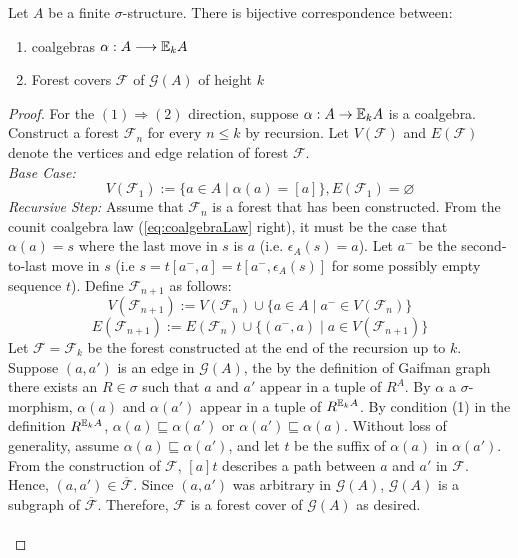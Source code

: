 \begin{prop}
Let $A$ be a finite $\sigma$-structure. There is bijective correspondence between:
\begin{enumerate}[label=(\arabic*)]
\item coalgebras $\alpha:A \longrightarrow {\mathbb{E}_{k}A}$
\item Forest covers $\mathcal{F}$ of $\mathcal{G}(A)$ of height $k$ 
\end{enumerate}
\begin{proof}
For the $(1) \Rightarrow (2)$ direction, suppose $\alpha:A \rightarrow {\mathbb{E}_{k}A}$ is a coalgebra. Construct a forest $\mathcal{F}_{n}$ for every $n \leq k$ by recursion. Let $V(\mathcal{F})$ and $E(\mathcal{F})$ denote the vertices and edge relation of forest $\mathcal{F}$. \\
\textit{Base Case:} $$V(\mathcal{F}_{1}) := \{a \in A \mid \alpha(a) = [a]\}, E(\mathcal{F}_{1}) = \varnothing$$
\textit{Recursive Step:} Assume that $\mathcal{F}_{n}$ is a forest that has been constructed. From the counit coalgebra law (\ref{eq:coalgebraLaw} right), it must be the case that $\alpha(a) = s$ where the last move in $s$ is $a$ (i.e. $\epsilon_{A}(s) = a$). Let $a^{-}$ be the second-to-last move in $s$ (i.e $s = t[a^{-},a] = t[a^{-},\epsilon_{A}(s)]$ for some possibly empty sequence $t$). Define $\mathcal{F}_{n+1}$ as follows:  
$$V(\mathcal{F}_{n+1}) := V(\mathcal{F}_{n}) \cup \{a \in A \mid a^{-} \in V(\mathcal{F}_{n})\}$$
$$E(\mathcal{F}_{n+1}) := E(\mathcal{F}_{n}) \cup \{(a^{-},a) \mid a \in  V(\mathcal{F}_{n+1})\}$$ 
Let $\mathcal{F} = \mathcal{F}_{k}$ be the forest constructed at the end of the recursion up to $k$. Suppose $(a,a')$ is an edge in $\mathcal{G}(A)$, the by the definition of Gaifman graph there exists an $R \in \sigma$ such that $a$ and $a'$ appear in a tuple of $R^{A}$. By $\alpha$ a $\sigma$-morphism, $\alpha(a)$ and $\alpha(a')$ appear in a tuple of $R^{{\mathbb{E}_{k}A}}$. By condition (1) in the definition $R^{{\mathbb{E}_{k}A}}$, $\alpha(a) \sqsubseteq \alpha(a')$ or $\alpha(a') \sqsubseteq \alpha(a)$. Without loss of generality, assume $\alpha(a) \sqsubseteq \alpha(a')$, and let $t$ be the suffix of $\alpha(a)$ in $\alpha(a')$. From the construction of $\mathcal{F}$, $[a]t$ describes a path between $a$ and $a'$ in $\mathcal{F}$. Hence, $(a,a') \in \overline{\mathcal{F}}$. Since $(a,a')$ was arbitrary in $\mathcal{G}(A)$, $\mathcal{G}(A)$ is a subgraph of $\overline{\mathcal{F}}$. Therefore, $\mathcal{F}$ is a forest cover of $\mathcal{G}(A)$ as desired. \\~\\

\end{proof}
\end{prop}
